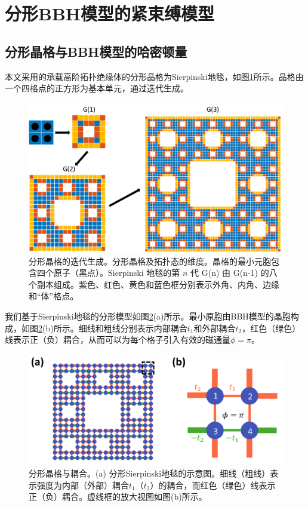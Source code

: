 \section{分形BBH模型的紧束缚模型}
\subsection{分形晶格与BBH模型的哈密顿量}
本文采用的承载高阶拓扑绝缘体的分形晶格为Sierpinski地毯，如图\ref{fig:Generation}所示。晶格由一个四格点的正方形为基本单元，通过迭代生成。
\begin{figure}[htbp]
    \centering
    \includegraphics[width=0.75\linewidth]{figure/HOTITheo/Generation.png}
    \caption{分形晶格的迭代生成。分形晶格及拓扑态的维度。晶格的最小元胞包含四个原子（黑点）。Sierpinski 地毯的第 \( n \) 代 G(n) 由 G(n-1) 的八个副本组成。紫色、红色、黄色和蓝色框分别表示外角、内角、边缘和“体”格点。}
    \label{fig:Generation}
\end{figure}

我们基于Sierpinski地毯的分形模型如图\ref{fig:HOTIlattice}(a)所示。最小原胞由BBH模型的晶胞构成，如图\ref{fig:HOTIlattice}(b)所示。细线和粗线分别表示内部耦合$t_1$和外部耦合$t_2$，红色（绿色）线表示正（负）耦合，从而可以为每个格子引入有效的磁通量$\phi=\pi$。

\begin{figure}[htbp]
    \centering
    \includegraphics[width=0.5\linewidth]{figure/HOTITheo/HOTIlattice.png}
    \caption{分形晶格与耦合。(a) 分形Sierpinski地毯的示意图。细线（粗线）表示强度为内部（外部）耦合$t_1$（$t_2$）的耦合，而红色（绿色）线表示正（负）耦合。虚线框的放大视图如图(b)所示。}
    \label{fig:HOTIlattice}
\end{figure}

